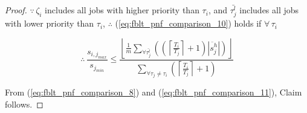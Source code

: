 \documentclass[conference,letterpaper]{IEEEtran}
\newtheorem{clm}{Claim}
\begin{document}
\begin{proof}
%
$\because\,\zeta_{i}$ includes all jobs with higher priority than
$\tau_{i}$, and $\bar{\tau_{j}^{l}}$ includes all jobs with lower
priority than $\tau_{i}$, $\therefore$ (\ref{eq:fblt_pnf_comparison_10})
holds if $\forall\,\tau_{i}$
%

%
\begin{equation}
\therefore\,\frac{s_{i,j_{max}}}{s_{j_{min}}}\le\frac{\left\lfloor \frac{1}{m}\sum_{\forall\bar{\tau_{j}^{l}}}\left(\left(\left\lceil \frac{T_{i}}{T_{j}}\right\rceil +1\right)|\ddot{s_{j}^{h}}|\right)\right\rfloor }{\sum_{\forall\tau_{j}\neq\tau_{i}}\left(\left\lceil \frac{T_{i}}{T_{j}}\right\rceil +1\right)}\label{eq:fblt_pnf_comparison_11}
\end{equation}
%

%
From (\ref{eq:fblt_pnf_comparison_8}) and (\ref{eq:fblt_pnf_comparison_11}),
Claim follows.

\end{proof}
%

\end{document}
